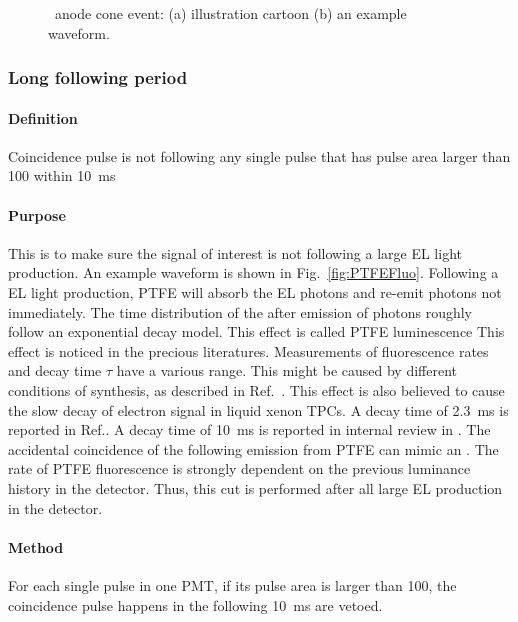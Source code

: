 \begin{figure}[!p]
\begin{subfigure}[b]{\halfwidth}
		\caption{}
		\label{fig:AboveAnode b}
	\end{subfigure}
	\caption[\gtest\ anode cone event]{\gtest\ anode cone event: (a) illustration cartoon (b) an example waveform. }
	\label{fig:AboveAnode}
\end{figure}


\subsubsection{Long following period}

\paragraph{Definition}
Coincidence pulse is not following any single pulse that has pulse area larger than \SI{100}{\phe} within \SI{10}{\ms}
\paragraph{Purpose}
This is to make sure the signal of interest is not following a large EL light production. An example waveform is shown in Fig.~\ref{fig:PTFEFluo}. Following a EL light production, PTFE will absorb the EL photons and re-emit photons not immediately. The time distribution of the after emission of photons roughly follow an exponential decay model. This effect is called PTFE luminescence This effect is noticed in the precious literatures. Measurements of fluorescence rates and decay time $\tau$ have a various range. This might be caused by different conditions of synthesis, as described in Ref.~\cite{Gachkovskii1969}. This effect is also believed to cause the slow decay of electron signal in liquid xenon TPCs. A decay time of \SI{2.3}{\ms} is reported in Ref.\cite{Sorensen2018}. A decay time of \SI{10}{\ms} is reported in internal review in \luxe . The accidental coincidence of the following emission from PTFE can mimic an \eep . The rate of PTFE fluorescence is strongly dependent on the previous luminance history in the detector. Thus, this cut is performed after all large EL production in the detector. 


\paragraph{Method}
For each single pulse in one PMT, if its pulse area is larger than \SI{100}{\phe}, the coincidence pulse happens in the following \SI{10}{\ms} are vetoed. 


